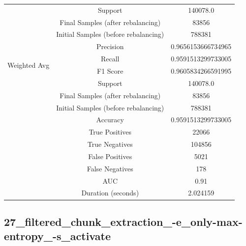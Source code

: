 \begin{longtable}{|c|c|c|}
 & Support & 140078.0 \\
 & Final Samples (after rebalancing) & 83856 \\
 & Initial Samples (before rebalancing) & 788381 \\
\hline
\multirow{4}{*}{Weighted Avg} & Precision & 0.9656153666734965 \\
 & Recall & 0.9591513299733005 \\
 & F1 Score & 0.9605834266591995 \\
 & Support & 140078.0 \\
 & Final Samples (after rebalancing) & 83856 \\
 & Initial Samples (before rebalancing) & 788381 \\
\hline
& Accuracy & 0.9591513299733005 \\ \hline
& True Positives & 22066 \\ \hline
& True Negatives & 104856 \\ \hline
& False Positives & 5021 \\ \hline
& False Negatives & 178 \\ \hline
& AUC & 0.91 \\ \hline
& Duration (seconds) & 2.024159 \\ \hline
\end{longtable}


\subsection{27\_filtered\_chunk\_extraction\_-e\_only-max-entropy\_-s\_activate}

